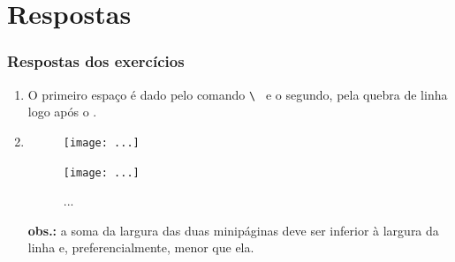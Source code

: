 \documentclass[handout,10pt]{beamer}
\begin{document}
\section{Respostas}
\begin{frame}[fragile,label=respostas]
	\frametitle{Respostas dos exercícios}

	\footnotesize

	\begin{enumerate}
	\item O primeiro espaço é dado pelo comando \verb*|\ | e o segundo, pela quebra de linha logo após o .
	\item%
		\begin{LaTeXcode}
			\begin{figure}			  
			  \begin{minipage}{0.45\textwidth}
			  	\texttt{[image: ...]}
			  	\caption{...}
			  \end{minipage}\hfill
			  \begin{minipage}{0.45\textwidth}
			  	\texttt{[image: ...]}
			  	\caption{...}
			  \end{minipage}
			\end{figure}
		\end{LaTeXcode}
		
		\textbf{obs.:} a soma da largura das duas minipáginas deve ser inferior à largura da linha e, preferencialmente, menor que ela.
	\end{enumerate}

\end{frame}
\end{document}
